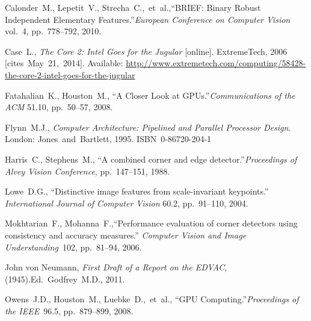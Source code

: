 {\raggedright
	\begin{thebibliography}{99}
		
			Calonder~M., Lepetit~V., Strecha~C.,~et~al.,\linebreak[1]
			``BRIEF: Binary Robust Independent Elementary Features.''\linebreak[1]
			\textit{European Conference on Computer Vision} vol.~4, pp.~778--792,
			2010.
		
			Case~L.,
			\textit{The Core 2: Intel Goes for the Jugular} [online].
			ExtremeTech, 2006 [cites~May~21,~2014].
			Available: \url{http://www.extremetech.com/computing/58428-the-core-2-intel-goes-for-the-jugular}
		
			Fatahalian~K., Houston~M.,
			``A Closer Look at GPUs.''\linebreak[1]
			\textit{Communications of the ACM} 51.10, pp.~50--57, 2008.
		
			Flynn~M.J.,
			\textit{Computer Architecture: Pipelined and Parallel Processor Design}.
			\linebreak[3]
			London: Jones~and~Bartlett, 1995. ISBN~0-86720-204-1
		
			Harris~C., Stephens~M.,
			``A combined corner and edge detector.''\linebreak[1]
			\textit{Proceedings of Alvey Vision Conference}, pp.~147--151, 1988.
		
			Lowe~D.G.,
			``Distinctive image features from scale-invariant keypoints.''
			\textit{International Journal of Computer Vision} 60.2,
			pp.~91--110, 2004.
		
			Mokhtarian~F., Mohanna~F.,\linebreak[1]
			``Performance evaluation of corner detectors using
			consistency and accuracy measures.''
			\textit{Computer Vision and Image Understanding}~102, pp.~81--94, 2006.
		
			John von Neumann,
			\textit{First Draft of a Report on the EDVAC}, (1945).\linebreak[2]
			Ed.~Godfrey~M.D., 2011.
		
			Owens~J.D., Houston~M., Luebke~D.,~et~al.,
			``GPU Computing.''\linebreak[1]
			\textit{Proceedings of the IEEE}~96.5, pp.~879--899,
			2008.
		

\end{thebibliography}}
